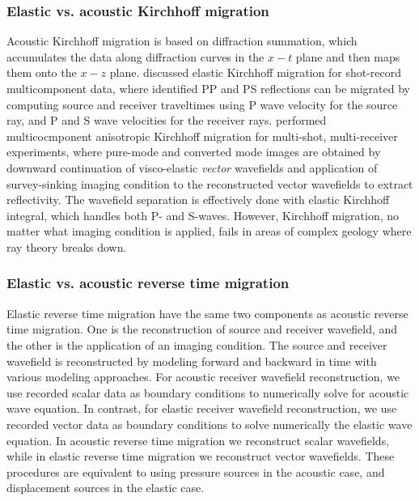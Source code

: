 \subsubsection{Elastic vs. acoustic Kirchhoff migration}
Acoustic Kirchhoff migration is based on diffraction summation, which accumulates the data along diffraction curves in the $x-t$ plane and then maps them onto the $x-z$ plane. 
\cite{GEO49-08-12231238} discussed elastic Kirchhoff migration for shot-record multicomponent data, where identified PP and PS reflections can be migrated by computing source and receiver traveltimes using P wave velocity for the source ray, and P and S wave velocities for the receiver rays. 
\cite{hokstad:861} performed multicocmponent anisotropic Kirchhoff migration for multi-shot, multi-receiver experiments, where pure-mode and converted mode images are obtained by downward continuation of visco-elastic \emph{vector} wavefields and application of survey-sinking imaging condition to the reconstructed vector wavefields to extract reflectivity. The wavefield separation is effectively done with elastic Kirchhoff integral, which handles both P- and S-waves.
However, Kirchhoff migration, no matter what imaging condition is applied, fails in areas of complex geology where ray theory breaks down.

\subsubsection{Elastic vs. acoustic reverse time migration}
Elastic reverse time migration have the same two components as acoustic reverse time migration. One is the reconstruction of source and receiver wavefield, and the other is the application of an imaging condition. 
The source and receiver wavefield is reconstructed by modeling forward and backward in time with various modeling approaches. For acoustic receiver wavefield reconstruction, we use recorded scalar data as boundary conditions to numerically solve for acoustic wave equation. In contrast, for elastic receiver wavefield reconstruction, we use recorded vector data as boundary conditions to solve numerically the elastic wave equation. In acoustic reverse time migration we reconstruct scalar wavefields, while in elastic reverse time migration we reconstruct vector wavefields.
These procedures are equivalent to using pressure sources in the acoustic case, and displacement sources in the elastic case.


